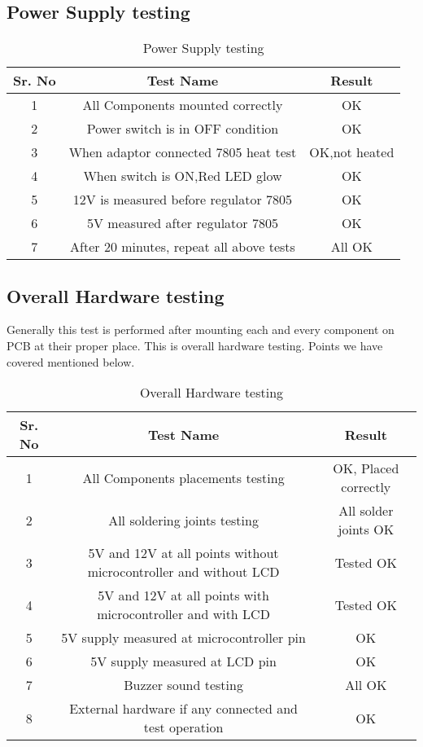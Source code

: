 \documentclass[12pt,Times]{report}
\begin{document}
\subsection{Power Supply testing}
\begin{table}[htbp]
	\caption{Power Supply testing}
	\label{tab:Power Supply testing}
	 \begin{tabular}{|c|c|c|} 
 \hline
 \textbf{Sr. No} &\textbf{Test Name} & \textbf{Result}\\ [0.5ex] 
 \hline
1& All Components mounted correctly& OK\\
\hline
2&Power switch is in OFF condition& OK\\
\hline
3&When adaptor connected 7805 heat test& OK,not heated\\
\hline
4&When switch is ON,Red LED glow&OK\\
\hline
5&12V is measured before regulator 7805&OK\\
\hline
6&5V measured after regulator 7805& OK\\
\hline
7&After 20 minutes, repeat all above tests& All OK
\hline
\end{tabular}	 
\end{table}
\newpage
\subsection{Overall Hardware testing}
Generally this test is performed after mounting each and every component on PCB at their proper place. This is overall hardware testing. Points we have covered mentioned below.
\begin{table}[htbp]
	\caption{Overall Hardware testing}
	\label{tab:Overall Hardware testing}
	 \begin{tabular}{|c|c|c|} 
 \hline
 \textbf{Sr. No} &\textbf{Test Name} & \textbf{Result}\\ [0.5ex] 
 \hline
1& All Components placements testing& OK, Placed correctly\\
\hline
2&All soldering joints testing& All solder joints OK\\
\hline
3&5V and 12V at all points without microcontroller and without LCD&Tested OK\\
\hline
4&5V and 12V at all points with microcontroller and with LCD&Tested OK\\
\hline
5&5V supply measured at microcontroller pin&OK\\
\hline
6&5V supply measured at LCD pin& OK\\
\hline
7&Buzzer sound testing& All OK\\
\hline
8&External hardware if any connected and test operation&OK
\end{tabular}	 
\end{table}
\newpage
\end{document}
